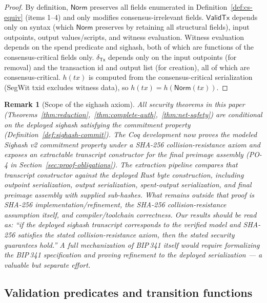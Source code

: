 \documentclass[11pt]{article}
\newtheorem{remark}{Remark}
\newcommand{\Tx}{\mathsf{Tx}}
\newcommand{\ValidTx}{\mathsf{ValidTx}}
\newcommand{\DeltaTx}{\delta_{\Tx}}
\begin{document}
\begin{proof}
By definition, $\mathsf{Norm}$ preserves all fields enumerated in Definition~\ref{def:cs-equiv} (items 1--4) and only modifies consensus-irrelevant fields.
$\ValidTx$ depends only on syntax (which $\mathsf{Norm}$ preserves by retaining all structural fields), input outpoints, output values/scripts, and witness evaluation.
Witness evaluation depends on the spend predicate and sighash, both of which are functions of the consensus-critical fields only.
$\DeltaTx$ depends only on the input outpoints (for removal) and the transaction id and output list (for creation), all of which are consensus-critical.
$h(tx)$ is computed from the consensus-critical serialization (SegWit txid excludes witness data), so $h(tx)=h(\mathsf{Norm}(tx))$.
\end{proof}

\begin{remark}[Scope of the sighash axiom]\label{rem:sighash-scope}
All security theorems in this paper (Theorems~\ref{thm:reduction},~\ref{thm:complete-auth},~\ref{thm:net-safety}) are conditional on the deployed sighash satisfying the commitment property (Definition~\ref{def:sighash-commit}).
The Coq development now proves the modeled Sighash v2 commitment property under a SHA-256 collision-resistance axiom and exposes an extractable transcript constructor for the final preimage assembly (PO-4 in Section~\ref{sec:proof-obligations}).
The extraction pipeline compares that transcript constructor against the deployed Rust byte construction, including outpoint serialization, output serialization, spent-output serialization, and final preimage assembly with supplied sub-hashes.
What remains outside that proof is SHA-256 implementation/refinement, the SHA-256 collision-resistance assumption itself, and compiler/toolchain correctness.
Our results should be read as: ``\emph{if} the deployed sighash transcript corresponds to the verified model and SHA-256 satisfies the stated collision-resistance axiom, \emph{then} the stated security guarantees hold.''
A full mechanization of BIP\,341 itself would require formalizing the BIP\,341 specification and proving refinement to the deployed serialization --- a valuable but separate effort.
\end{remark}

\subsection{Validation predicates and transition functions}
\end{document}

